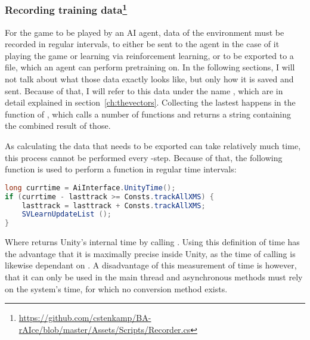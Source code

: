 \subsubsection{Recording training data\footnote{\url{https://github.com/cstenkamp/BA-rAIce/blob/master/Assets/Scripts/Recorder.cs}}}

For the game to be played by an AI agent, data of the environment must be recorded in regular intervals, to either be sent to the agent in the case of it playing the game or learning via reinforcement learning, or to be exported to a file, which an agent can perform pretraining on. In the following sections, I will not talk about what those data exactly looks like, but only how it is saved and sent. Because of that, I will refer to this data under the name , which are in detail explained in section~\ref{ch:thevectors}. Collecting the lastest  happens in the function  of , which calls a number of functions and returns a string containing the combined result of those.

As calculating the data that needs to be exported can take relatively much time, this process cannot be performed every -step. Because of that, the following function is used to perform a function in regular time intervals:
\begin{lstlisting}[language=C#, style=CSharp, frame=none]
long currtime = AiInterface.UnityTime();
if (currtime - lasttrack >= Consts.trackAllXMS) {
	lasttrack = lasttrack + Consts.trackAllXMS; 
	SVLearnUpdateList ();
}
\end{lstlisting}%

Where  returns Unity's internal time by calling . Using this definition of time has the advantage that it is maximally precise inside Unity, as the time of calling  is likewise dependant on . A disadvantage of this measurement of time is however, that it can only be used in the main thread and asynchronous methods must rely on the system's time, for which no conversion method exists.

